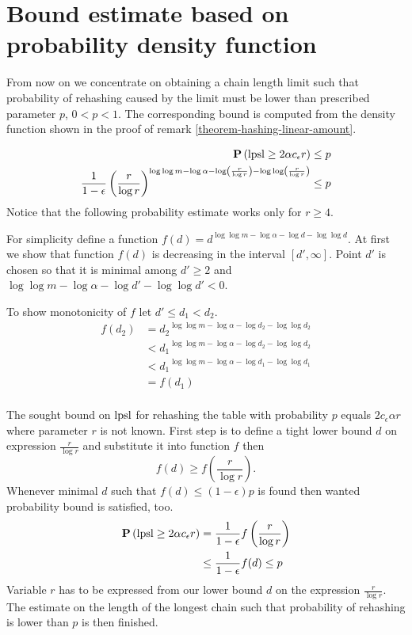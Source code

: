 \section{Bound estimate based on probability density function}
\label{section-linear-systems-linear-amount-constant-estimate}
From now on we concentrate on obtaining a chain length limit such that probability of rehashing caused by the limit must be lower than prescribed parameter $p$, $0 < p < 1$. The corresponding bound is computed from the density function shown in the proof of remark \ref{theorem-hashing-linear-amount}. 

\[
\begin{split}
\mathbf{P}\left(\mathrm{lpsl} \geq 2\alpha c_\epsilon r\right) & \leq p \\ 
\frac{1}{1 - \epsilon}\left(\frac{r}{\log r}\right)^{\log \log m - \log \alpha - \log \left(\frac{r}{\log r}\right) - \log \log \left(\frac{r}{\log r}\right)} & \leq p \\
\end{split}
\]
Notice that the following probability estimate works only for $r \geq 4$. 

For simplicity define a function $f(d) = d ^ {\log \log m - \log \alpha - \log d - \log \log d}$. At first we show that function $f(d)$ is decreasing in the interval $\left[ d', \infty \right]$. Point $d'$ is chosen so that it is minimal among $d' \geq 2$ and $\log \log m - \log \alpha - \log d' - \log \log d' < 0$. 

To show monotonicity of $f$ let $d' \leq d_1 < d_2$.
\[
\begin{split}
f(d_2) 
	& = {d_2} ^ {\log \log m - \log \alpha - \log d_2 - \log \log d_2} \\
	& < {d_1} ^ {\log \log m - \log \alpha - \log d_2 - \log \log d_2} \\
	& < {d_1} ^ {\log \log m - \log \alpha - \log d_1 - \log \log d_1} \\
	& = f(d_1) \\
\end{split}
\]

The sought bound on $\mathrm{lpsl}$ for rehashing the table with probability $p$ equals $2 c_\epsilon \alpha r$ where parameter $r$ is not known. First step is to define a tight lower bound $d$ on expression $\frac{r}{\log r}$ and substitute it into function $f$ then \[ f(d) \geq f\left(\frac{r}{\log r}\right) \text{.} \] Whenever minimal $d$ such that $f(d) \leq (1 - \epsilon) p$ is found then wanted probability bound is satisfied, too.
\[ 
\begin{split}
\mathbf{P}\left(\mathrm{lpsl} \geq 2 \alpha c_\epsilon r\right) 
	& = \frac{1}{1 - \epsilon} f\left(\frac{r}{\log r}\right) \\
	& \leq \frac{1}{1-\epsilon}f(d) \leq p \\
\end{split}
\]
Variable $r$ has to be expressed from our lower bound $d$ on the expression $\frac{r}{\log r}$. The estimate on the length of the longest chain such that probability of rehashing is lower than $p$ is then finished.

